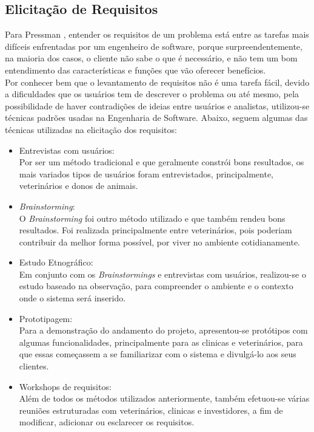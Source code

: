 \subsection{Elicitação de Requisitos}
Para Pressman \cite{Pressman2006}, entender os requisitos de um problema está entre as tarefas mais difíceis enfrentadas por um engenheiro de software, porque surpreendentemente, na maioria dos casos, o cliente não sabe o que é necessário, e não tem um bom entendimento das características e funções que vão oferecer benefícios.
\\
\indent
Por conhecer bem que o levantamento de requisitos não é uma tarefa fácil, devido a dificuldades que os usuários tem de descrever o problema ou até mesmo, pela possibilidade de haver contradições de ideias entre usuários e analistas, utilizou-se técnicas padrões usadas na Engenharia de Software. Abaixo, seguem algumas das técnicas utilizadas na elicitação dos requisitos:
\begin{itemize}
   \item Entrevistas com usuários:
   \\
   \indent
   Por ser um método tradicional e que geralmente constrói bons resultados, os mais variados tipos de usuários foram entrevistados, principalmente, veterinários e donos de animais. 
   \item {\it Brainstorming}:
    \\
   \indent
   O {\it Brainstorming} foi outro método utilizado e que também rendeu bons resultados. Foi realizada principalmente entre veterinários, pois poderiam contribuir da melhor forma possível, por viver no ambiente cotidianamente. 
   \item Estudo Etnográfico:
   \\
   \indent
   Em conjunto com os {\it Brainstormings} e entrevistas com usuários, realizou-se o estudo baseado na observação, para compreender o ambiente e o contexto onde o sistema será inserido.
   \item Prototipagem: 
   \\
   \indent
   Para a demonstração do andamento do projeto, apresentou-se protótipos com algumas funcionalidades, principalmente para as clinicas e veterinários, para que essas começassem a se familiarizar com o sistema e divulgá-lo aos seus clientes.
   \item Workshops de requisitos:
   \\
   \indent
   Além de todos os métodos utilizados anteriormente, também efetuou-se várias reuniões estruturadas com veterinários, clinicas e investidores, a fim de modificar, adicionar ou esclarecer os requisitos.
 \end{itemize}
 
